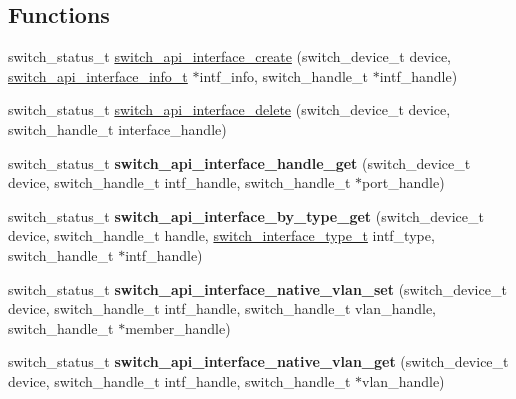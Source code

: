 \subsection*{Functions}
\begin{DoxyCompactItemize}
\item 
switch\+\_\+status\+\_\+t \hyperlink{group__Interface_ga856cb62c1d6c160c981157dabec846f9}{switch\+\_\+api\+\_\+interface\+\_\+create} (switch\+\_\+device\+\_\+t device, \hyperlink{group__Interface_gac12fe27937cc35580197d25bf616c5d3}{switch\+\_\+api\+\_\+interface\+\_\+info\+\_\+t} $\ast$intf\+\_\+info, switch\+\_\+handle\+\_\+t $\ast$intf\+\_\+handle)
\item 
switch\+\_\+status\+\_\+t \hyperlink{group__Interface_ga214963b57668bb3ac31e97ce2ec1288c}{switch\+\_\+api\+\_\+interface\+\_\+delete} (switch\+\_\+device\+\_\+t device, switch\+\_\+handle\+\_\+t interface\+\_\+handle)
\item 
\hypertarget{group__Interface_ga2121467f012ae86588ffb5fae8ad08c1}{switch\+\_\+status\+\_\+t {\bfseries switch\+\_\+api\+\_\+interface\+\_\+handle\+\_\+get} (switch\+\_\+device\+\_\+t device, switch\+\_\+handle\+\_\+t intf\+\_\+handle, switch\+\_\+handle\+\_\+t $\ast$port\+\_\+handle)}\label{group__Interface_ga2121467f012ae86588ffb5fae8ad08c1}

\item 
\hypertarget{group__Interface_ga746e7a34b8977035828368cd39f38e14}{switch\+\_\+status\+\_\+t {\bfseries switch\+\_\+api\+\_\+interface\+\_\+by\+\_\+type\+\_\+get} (switch\+\_\+device\+\_\+t device, switch\+\_\+handle\+\_\+t handle, \hyperlink{group__Interface_ga6052d8868148cccd877ca7b8dc42e778}{switch\+\_\+interface\+\_\+type\+\_\+t} intf\+\_\+type, switch\+\_\+handle\+\_\+t $\ast$intf\+\_\+handle)}\label{group__Interface_ga746e7a34b8977035828368cd39f38e14}

\item 
\hypertarget{group__Interface_ga6d6e3dff8f7e4de45744449ba90613d7}{switch\+\_\+status\+\_\+t {\bfseries switch\+\_\+api\+\_\+interface\+\_\+native\+\_\+vlan\+\_\+set} (switch\+\_\+device\+\_\+t device, switch\+\_\+handle\+\_\+t intf\+\_\+handle, switch\+\_\+handle\+\_\+t vlan\+\_\+handle, switch\+\_\+handle\+\_\+t $\ast$member\+\_\+handle)}\label{group__Interface_ga6d6e3dff8f7e4de45744449ba90613d7}

\item 
\hypertarget{group__Interface_ga26f73ee9b6b649bbfad8b53ea0783516}{switch\+\_\+status\+\_\+t {\bfseries switch\+\_\+api\+\_\+interface\+\_\+native\+\_\+vlan\+\_\+get} (switch\+\_\+device\+\_\+t device, switch\+\_\+handle\+\_\+t intf\+\_\+handle, switch\+\_\+handle\+\_\+t $\ast$vlan\+\_\+handle)}\label{group__Interface_ga26f73ee9b6b649bbfad8b53ea0783516}


\end{DoxyCompactItemize}
